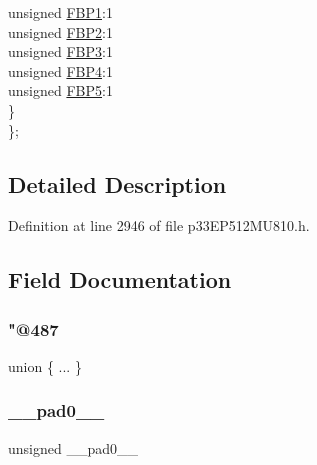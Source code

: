 \begin{DoxyCompactItemize}
\begin{tabbing}
\>\>unsigned \hyperlink{structtag_c1_f_i_f_o_b_i_t_s_afe0369a4835e96fa3b1334cd140b1d40}{FBP1}:1\\
\>\>unsigned \hyperlink{structtag_c1_f_i_f_o_b_i_t_s_a35fb89b933e40e9b8fe29b5568e9b332}{FBP2}:1\\
\>\>unsigned \hyperlink{structtag_c1_f_i_f_o_b_i_t_s_aa7a5b62ee2858665b1eb73cd44d8167a}{FBP3}:1\\
\>\>unsigned \hyperlink{structtag_c1_f_i_f_o_b_i_t_s_a2c9b756d81a91c50bd9e4a5e37d1b315}{FBP4}:1\\
\>\>unsigned \hyperlink{structtag_c1_f_i_f_o_b_i_t_s_a54c7e566a39928910ca3d2014f285fe9}{FBP5}:1\\
\>\} \\
\}; \\

\end{tabbing}\end{DoxyCompactItemize}


\subsection{Detailed Description}


Definition at line 2946 of file p33\+E\+P512\+M\+U810.\+h.



\subsection{Field Documentation}
\mbox{\label{structtag_c1_f_i_f_o_b_i_t_s_a6cf8637a90fb645b230518666fb2c537}} 
\subsubsection{\texorpdfstring{"@487}{@487}}
{\footnotesize\ttfamily union \{ ... \} }

\mbox{\label{structtag_c1_f_i_f_o_b_i_t_s_adf71f3d8410c1f1dbbc96680a92c49af}} 
\subsubsection{\texorpdfstring{\+\_\+\+\_\+pad0\+\_\+\+\_\+}{\_\_pad0\_\_}}
{\footnotesize\ttfamily unsigned \+\_\+\+\_\+pad0\+\_\+\+\_\+}



